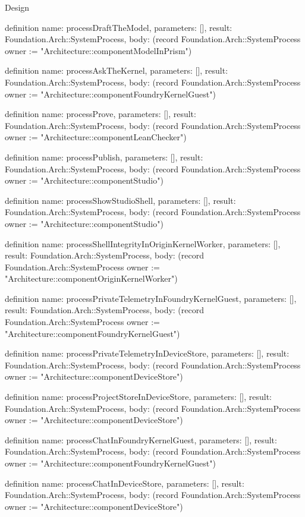 \begin{lexlean}{Design}
\begin{semanticmodule}
definition{
  name: processDraftTheModel,
  parameters: [],
  result: Foundation.Arch::SystemProcess,
  body: (record Foundation.Arch::SystemProcess {owner := "Architecture::componentModelInPrism"})
}

definition{
  name: processAskTheKernel,
  parameters: [],
  result: Foundation.Arch::SystemProcess,
  body: (record Foundation.Arch::SystemProcess {owner := "Architecture::componentFoundryKernelGuest"})
}

definition{
  name: processProve,
  parameters: [],
  result: Foundation.Arch::SystemProcess,
  body: (record Foundation.Arch::SystemProcess {owner := "Architecture::componentLeanChecker"})
}

definition{
  name: processPublish,
  parameters: [],
  result: Foundation.Arch::SystemProcess,
  body: (record Foundation.Arch::SystemProcess {owner := "Architecture::componentStudio"})
}

definition{
  name: processShowStudioShell,
  parameters: [],
  result: Foundation.Arch::SystemProcess,
  body: (record Foundation.Arch::SystemProcess {owner := "Architecture::componentStudio"})
}

definition{
  name: processShellIntegrityInOriginKernelWorker,
  parameters: [],
  result: Foundation.Arch::SystemProcess,
  body: (record Foundation.Arch::SystemProcess {owner := "Architecture::componentOriginKernelWorker"})
}

definition{
  name: processPrivateTelemetryInFoundryKernelGuest,
  parameters: [],
  result: Foundation.Arch::SystemProcess,
  body: (record Foundation.Arch::SystemProcess {owner := "Architecture::componentFoundryKernelGuest"})
}

definition{
  name: processPrivateTelemetryInDeviceStore,
  parameters: [],
  result: Foundation.Arch::SystemProcess,
  body: (record Foundation.Arch::SystemProcess {owner := "Architecture::componentDeviceStore"})
}

definition{
  name: processProjectStoreInDeviceStore,
  parameters: [],
  result: Foundation.Arch::SystemProcess,
  body: (record Foundation.Arch::SystemProcess {owner := "Architecture::componentDeviceStore"})
}

definition{
  name: processChatInFoundryKernelGuest,
  parameters: [],
  result: Foundation.Arch::SystemProcess,
  body: (record Foundation.Arch::SystemProcess {owner := "Architecture::componentFoundryKernelGuest"})
}

definition{
  name: processChatInDeviceStore,
  parameters: [],
  result: Foundation.Arch::SystemProcess,
  body: (record Foundation.Arch::SystemProcess {owner := "Architecture::componentDeviceStore"})
}


\end{semanticmodule}
\end{lexlean}
